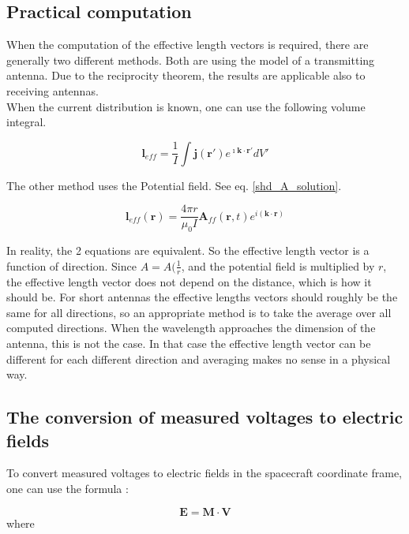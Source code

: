 \documentclass[a4paper,11pt]{report}
\begin{document}
\subsection{Practical computation}
When the computation of the effective length vectors is required, there are generally two different methods. Both are using the model of a transmitting antenna. Due to the reciprocity theorem, the results are applicable also to receiving antennas.\\

When the current distribution is known, one can use the following volume integral.

\begin{equation}\label{eq:heff}
\textbf{l}_{eff}=\frac{1}{I}\int \mathbf{j}(\mathbf{r}')e^{\imath \mathbf{k} \cdot \mathbf{r}'} dV'
 \end{equation}

The other method uses the Potential field. See eq. \ref{shd_A_solution}.

\begin{equation}\label{l_eff_with_1}
 \mathbf{l}_{eff}(\mathbf{r}) =\frac{4 \pi r}{\mu_0 I }\mathbf{A}_{ff}(\mathbf{r},t) e^{i(\mathbf{k}\cdot \mathbf{r})}
\end{equation}

In reality, the 2 equations are equivalent. So the effective length vector is a function of direction. Since $A=A(\frac{1}{r}$, and the potential field is multiplied by $r$, the effective length vector does not depend on the distance, which is how it should be. For short antennas the effective lengths vectors should roughly be the same for all directions, so an appropriate method is to take the average over all computed directions. When the wavelength approaches the dimension of the antenna, this is not the case. In that case the effective length vector can be different for each different direction and averaging makes no sense in a physical way.\\

\subsection{The conversion of measured voltages to electric fields}
To convert measured voltages to electric fields in the spacecraft coordinate frame, one can use the formula \cite{bale08}:

\begin{equation}
 \mathbf{E}=\mathbf{M}\cdot \mathbf{V}
\end{equation}
where
\end{document}
